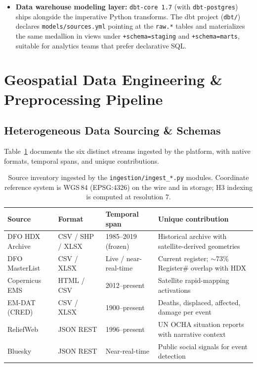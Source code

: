\documentclass[11pt,a4paper]{article}
\begin{document}
\begin{itemize}
    \item \textbf{Data warehouse modeling layer:} \texttt{dbt-core 1.7}
    (with \texttt{dbt-postgres}) ships alongside the imperative Python
    transforms. The dbt project (\texttt{dbt/}) declares
    \texttt{models/sources.yml} pointing at the \texttt{raw.*} tables and
    materializes the same medallion in views under
    \texttt{+schema=staging} and \texttt{+schema=marts}, suitable for
    analytics teams that prefer declarative SQL.
\end{itemize}

\section{Geospatial Data Engineering \& Preprocessing Pipeline}

\subsection{Heterogeneous Data Sourcing \& Schemas}

Table~\ref{tab:sources} documents the six distinct streams ingested by the
platform, with native formats, temporal spans, and unique contributions.

\begin{table}[h!]
\centering
\small
\begin{tabular}{@{}lllp{6.5cm}@{}}
\toprule
\textbf{Source} & \textbf{Format} & \textbf{Temporal span} & \textbf{Unique contribution} \\
\midrule
DFO HDX Archive   & CSV / SHP / XLSX & 1985--2019 (frozen)      & Historical archive with satellite-derived geometries \\
DFO MasterList    & CSV / XLSX       & Live / near-real-time    & Current register; $\sim$73\% Register\# overlap with HDX \\
Copernicus EMS    & HTML / CSV       & 2012--present            & Satellite rapid-mapping activations \\
EM-DAT (CRED)     & CSV / XLSX       & 1900--present            & Deaths, displaced, affected, damage per event \\
ReliefWeb         & JSON REST        & 1996--present            & UN OCHA situation reports with narrative context \\
Bluesky           & JSON REST        & Near-real-time           & Public social signals for event detection \\
\bottomrule
\end{tabular}
\caption{Source inventory ingested by the \texttt{ingestion/ingest\_*.py}
modules. Coordinate reference system is WGS\,84 (EPSG:4326) on the wire and
in storage; H3 indexing is computed at resolution 7.}
\label{tab:sources}
\end{table}
\end{document}
